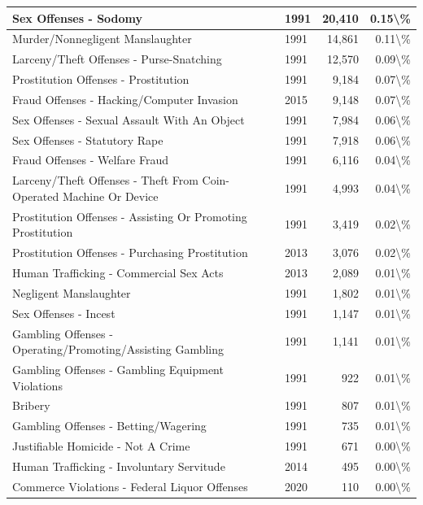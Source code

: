\documentclass[
]{krantz}
\begin{document}
\begin{longtable}[t]{l|l|r|r}
\hline
Sex Offenses - Sodomy & 1991 & 20,410 & 0.15\textbackslash{}\%\\
\hline
Murder/Nonnegligent Manslaughter & 1991 & 14,861 & 0.11\textbackslash{}\%\\
\hline
Larceny/Theft Offenses - Purse-Snatching & 1991 & 12,570 & 0.09\textbackslash{}\%\\
\hline
Prostitution Offenses - Prostitution & 1991 & 9,184 & 0.07\textbackslash{}\%\\
\hline
Fraud Offenses - Hacking/Computer Invasion & 2015 & 9,148 & 0.07\textbackslash{}\%\\
\hline
Sex Offenses - Sexual Assault With An Object & 1991 & 7,984 & 0.06\textbackslash{}\%\\
\hline
Sex Offenses - Statutory Rape & 1991 & 7,918 & 0.06\textbackslash{}\%\\
\hline
Fraud Offenses - Welfare Fraud & 1991 & 6,116 & 0.04\textbackslash{}\%\\
\hline
Larceny/Theft Offenses - Theft From Coin-Operated Machine Or Device & 1991 & 4,993 & 0.04\textbackslash{}\%\\
\hline
Prostitution Offenses - Assisting Or Promoting Prostitution & 1991 & 3,419 & 0.02\textbackslash{}\%\\
\hline
Prostitution Offenses - Purchasing Prostitution & 2013 & 3,076 & 0.02\textbackslash{}\%\\
\hline
Human Trafficking - Commercial Sex Acts & 2013 & 2,089 & 0.01\textbackslash{}\%\\
\hline
Negligent Manslaughter & 1991 & 1,802 & 0.01\textbackslash{}\%\\
\hline
Sex Offenses - Incest & 1991 & 1,147 & 0.01\textbackslash{}\%\\
\hline
Gambling Offenses - Operating/Promoting/Assisting Gambling & 1991 & 1,141 & 0.01\textbackslash{}\%\\
\hline
Gambling Offenses - Gambling Equipment Violations & 1991 & 922 & 0.01\textbackslash{}\%\\
\hline
Bribery & 1991 & 807 & 0.01\textbackslash{}\%\\
\hline
Gambling Offenses - Betting/Wagering & 1991 & 735 & 0.01\textbackslash{}\%\\
\hline
Justifiable Homicide - Not A Crime & 1991 & 671 & 0.00\textbackslash{}\%\\
\hline
Human Trafficking - Involuntary Servitude & 2014 & 495 & 0.00\textbackslash{}\%\\
\hline
Commerce Violations - Federal Liquor Offenses & 2020 & 110 & 0.00\textbackslash{}\%\\

\end{longtable}
\end{document}
